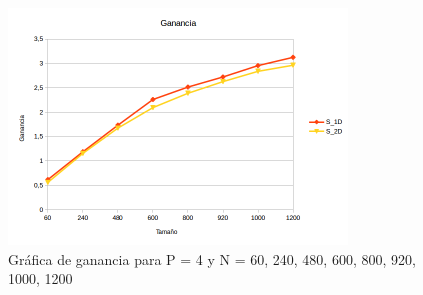 \begin{figure}[H]
	\centering
	\includegraphics[width=9cm]{img/ganancia}
	\caption{Gráfica de ganancia para P = 4 y N = 60, 240, 480, 600, 800, 920, 1000, 1200}
	\label{fig:grafica_ganancia}
\end{figure}


